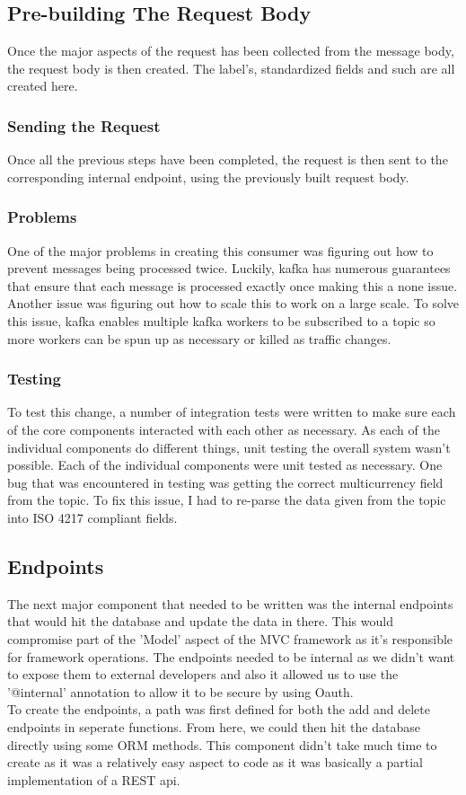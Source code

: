 \subsection{Pre-building The Request Body}
Once the major aspects of the request has been collected from the message body, the request body is then created. The label's, standardized fields and such are all created here.

\subsubsection{Sending the Request}
Once all the previous steps have been completed, the request is then sent to the corresponding internal endpoint, using the previously built request body. 

\subsubsection{Problems}
One of the major problems in creating this consumer was figuring out how to prevent messages being processed twice. Luckily, kafka has numerous guarantees that ensure that each message is processed exactly once making this a none issue. Another issue was figuring out how to scale this to work on a large scale. To solve this issue, kafka enables multiple kafka workers to be subscribed to a topic so more workers can be spun up as necessary or killed as traffic changes. 

\subsubsection{Testing}
To test this change, a number of integration tests were written to make sure each of the core components interacted with each other as necessary. As each of the individual components do different things, unit testing the overall system wasn't possible. Each of the individual components were unit tested as necessary. One bug that was encountered in testing was getting the correct multicurrency field from the topic. To fix this issue, I had to re-parse the data given from the topic into ISO 4217 compliant fields.

\subsection{Endpoints}
The next major component that needed to be written was the internal endpoints that would hit the database and update the data in there. This would compromise part of the 'Model' aspect of the MVC framework as it's responsible for framework operations. The endpoints needed to be internal as we didn't want to expose them to external developers and also it allowed us to use the '@internal' annotation to allow it to be secure by using Oauth. \newline \\ To create the endpoints, a path was first defined for both the add and delete endpoints in seperate functions. From here, we could then hit the database directly using some ORM methods. This component didn't take much time to create as it was a relatively easy aspect to code as it was basically a partial implementation of a REST api. 

